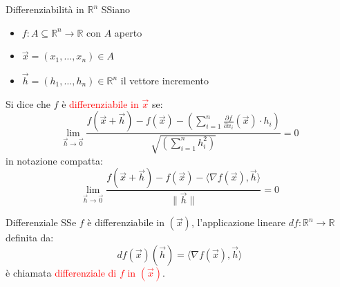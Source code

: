 \documentclass{article}  %
\begin{document}
\begin{theorem}{Differenziabilità in $\mathbb{R}^n$}
	SSiano
	\begin{itemize}
		\item $f: A \subseteq \mathbb{R}^n \to \mathbb{R}$ con $A$ aperto
		\item $\vec{x}=(x_1,\dots,x_n) \in A$
		\item $\vec{h}=(h_1,\dots,h_n) \in \mathbb{R}^n$ il vettore incremento
	\end{itemize}
	Si dice che $f$ è \textcolor{red}{differenziabile in $\vec{x}$} se:
	\[
		\lim_{\vec{h} \to \vec{0}} \frac{f(\vec{x}+\vec{h})-f(\vec{x})- \left(\sum_{i=1}^{n}\frac{\partial f}{\partial x_i}(\vec{x})\cdot h_i\right)}{\sqrt{\left(\sum_{i=1}^{n}h_i ^2\right)}} = 0
	\]
	in notazione compatta:
	\[
		\lim_{\vec{h} \to \vec{0}} \frac{f(\vec{x}+\vec{h})-f(\vec{x})- \langle \nabla f(\vec{x}), \vec{h} \rangle}{\|\vec{h}\|} = 0
	\]
\end{theorem}
\begin{definition}{Differenziale}
	SSe $f$ è differenziabile in $(\vec{x})$, l'applicazione lineare  $df: \mathbb{R}^n \to \mathbb{R}$ definita da:
	\[
		df(\vec{x})(\vec{h}) = \langle \nabla f(\vec{x}), \vec{h} \rangle
	\]
	è chiamata \textcolor{red}{differenziale di $f$ in $(\vec{x})$}.
\end{definition}
\end{document}
